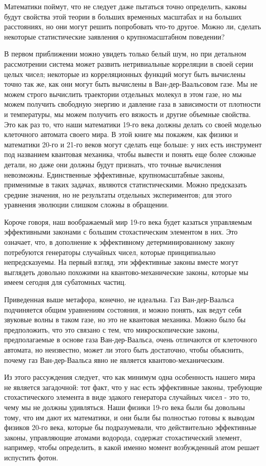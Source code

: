 \documentclass[main.tex]{subfiles}
\begin{document}
Математики поймут, что не следует даже пытаться точно определить, каковы будут свойства этой теории в больших временных масштабах и на больших расстояниях, но они могут решить попробовать что-то другое. Можно ли, сделать некоторые статистические заявления о крупномасштабном поведении? 

В первом приближении можно увидеть только белый шум, но при детальном рассмотрении система может развить нетривиальные корреляции в своей серии целых чисел; некоторые из корреляционных функций могут быть вычислены точно так же, как они могут быть вычислены в Ван-дер-Ваальсовом газе. Мы не можем строго вычислить траектории отдельных молекул в этом газе, но мы можем получить свободную энергию и давление газа в зависимости от плотности и температуры, мы можем получить его вязкость и другие объемные свойства. Это как раз то, что наши математики 19-го века должны делать со своей моделью клеточного автомата своего мира. В этой книге мы покажем, как физики и математики 20-го и 21-го веков могут сделать еще больше: у них есть инструмент под названием квантовая механика, чтобы вывести и понять еще более сложные детали, но даже они должны будут признать, что точные вычисления невозможны. Единственные эффективные, крупномасштабные законы, применимые в таких задачах, являются статистическими. Можно предсказать средние значения, но не результаты отдельных экспериментов; для этого уравнения эволюции слишком сложны в обращении. 

Короче говоря, наш воображаемый мир 19-го века будет казаться управляемым эффективными законами с большим стохастическим элементом в них. Это означает, что, в дополнение к эффективному детерминированному закону потребуются генераторы случайных чисел, которые принципиально непредсказуемы. На первый взгляд, эти эффективные законы вместе могут выглядеть довольно похожими на квантово-механические законы, которые мы имеем сегодня для субатомных частиц.

Приведенная выше метафора, конечно, не идеальна. Газ Ван-дер-Ваальса подчиняется общим уравнениям состояния, и можно понять, как ведут себя звуковые волны в таком газе, но это не квантовая механика. Можно было бы предположить, что это связано с тем, что микроскопические законы, предполагаемые в основе газа Ван-дер-Ваальса, очень отличаются от клеточного автомата, но неизвестно, может ли этого быть достаточно, чтобы объяснить, почему газ Ван-дер-Ваальса явно не является квантово-механическим. 

Из этого рассуждения следует, что как минимум одна особенность нашего мира не является загадочной: тот факт, что у нас есть эффективные законы, требующие стохастического элемента в виде эдакого генератора случайных чисел - это то, чему мы не должны удивляться. Наши физики 19-го века были бы довольны тому, что им дают их математики, и они были бы полностью готовы к выводам физиков 20-го века, которые бы подразумевали, что действительно эффективные законы, управляющие атомами водорода, содержат стохастический элемент, например, чтобы определить, в какой именно момент возбужденный атом решает испустить фотон. 
\end{document}
